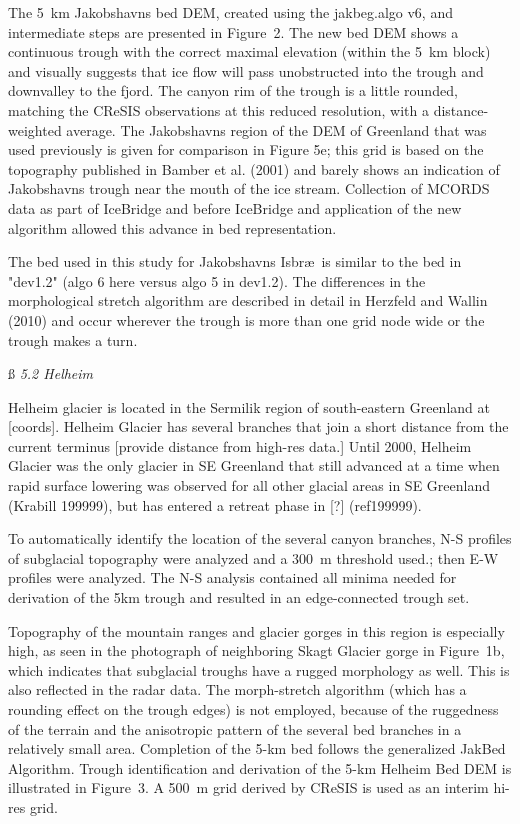 \documentclass[11pt]{article}
\begin{document}
 
 The 5~km Jakobshavns bed DEM, created using the jakbeg.algo v6, and intermediate steps are presented in Figure~2. The new bed DEM shows a continuous trough with the correct maximal elevation (within the 5~km block) and visually suggests that ice flow will pass unobstructed into the trough and downvalley to the fjord. The canyon rim of the trough is a little rounded, matching the CReSIS observations at this reduced resolution, with a distance-weighted average.
 The  Jakobshavns region of the DEM of Greenland that was used previously is given for comparison in Figure 5e; this grid is based on the topography published in Bamber et al. (2001) and barely shows an indication of Jakobshavns trough near the mouth of the ice stream. Collection of MCORDS data as part of IceBridge and before IceBridge and application of the new algorithm allowed this advance in bed representation.
 
  The bed used in this study for Jakobshavns Isbr\ae\ is similar to the bed in "dev1.2" (algo 6 here versus algo 5 in dev1.2).
 The differences in the morphological stretch algorithm are described in detail in Herzfeld and Wallin (2010)
 and occur wherever the trough is more than one grid node wide or the trough makes a turn.
 
  \ss
 {\it 5.2 Helheim}
 
 Helheim glacier is located in the Sermilik region of south-eastern Greenland at [coords]. Helheim
 Glacier has several branches that join a short distance from the current terminus [provide distance from high-res data.] Until 2000, Helheim Glacier was the only glacier in SE Greenland that still advanced at a time when
 rapid surface lowering was observed for all other glacial areas in SE Greenland (Krabill 199999), but has
 entered a retreat phase in [?] (ref199999).
 
 To automatically identify the location of the several canyon branches, N-S profiles of subglacial topography
 were analyzed and a 300~m threshold used.; then E-W profiles were analyzed. The N-S analysis contained
 all minima needed for derivation of the 5km trough and resulted in an edge-connected trough set.

Topography of the mountain ranges and glacier gorges in this region is especially high, as seen
 in the photograph of neighboring Skagt Glacier gorge in Figure~1b, which indicates that subglacial troughs
 have a rugged morphology as well. This is also reflected in the radar data. 
  The morph-stretch algorithm (which has a rounding effect on the trough edges) is not employed, because of the ruggedness of the terrain and the anisotropic pattern of the several bed branches in a relatively small area.
 Completion of the 5-km bed follows the generalized JakBed Algorithm.
 Trough identification and derivation of the 5-km Helheim Bed DEM is illustrated in Figure~3.
 A 500~m grid derived by CReSIS is used as an interim hi-res grid.
 
\end{document}
